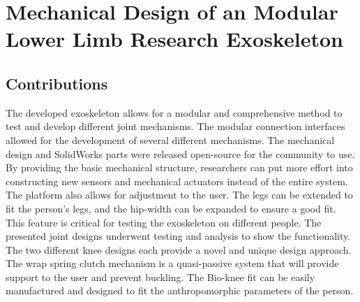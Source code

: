 
\chapter{Mechanical Design of an Modular Lower Limb Research Exoskeleton}
\label{chap:mech}











\section{Contributions}

The developed exoskeleton allows for a modular and comprehensive method to test and develop different joint mechanisms. The modular connection interfaces allowed for the development of several different mechanisms. The mechanical design and SolidWorks parts were released open-source for the community to use. By providing the basic mechanical structure, researchers can put more effort into constructing new sensors and mechanical actuators instead of the entire system. The platform also allows for adjustment to the user. The legs can be extended to fit the person's legs, and the hip-width can be expanded to ensure a good fit. This feature is critical for testing the exoskeleton on different people. The presented joint designs underwent testing and analysis to show the functionality. The two different knee designs each provide a novel and unique design approach. The wrap spring clutch mechanism is a quasi-passive system that will provide support to the user and prevent buckling. The Bio-knee fit can be easily manufactured and designed to fit the anthropomorphic parameters of the person.



